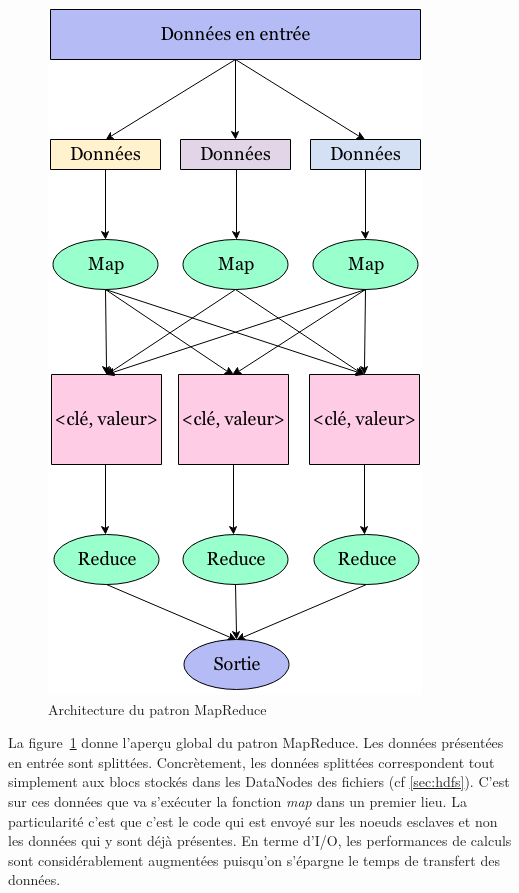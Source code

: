 \begin{figure}[h!]
  \centering
  \includegraphics[scale=0.4]{images/mapreduce_arch.png}
  \caption{Architecture du patron MapReduce}
  \label{fig:mapreduce-exp}
\end{figure}

\par La figure~\ref{fig:mapreduce-exp} donne l'aperçu global du patron MapReduce. Les données présentées en entrée sont splittées. Concrètement, les données splittées correspondent tout simplement aux blocs stockés dans les DataNodes des fichiers (cf \ref{sec:hdfs}). C'est sur ces données que va s'exécuter la fonction \textit{map} dans un premier lieu. La particularité c'est que c'est le code qui est envoyé sur les noeuds esclaves et non les données qui y sont déjà présentes. En terme d'I/O, les performances de calculs sont considérablement augmentées puisqu'on s'épargne le temps de transfert des données.

